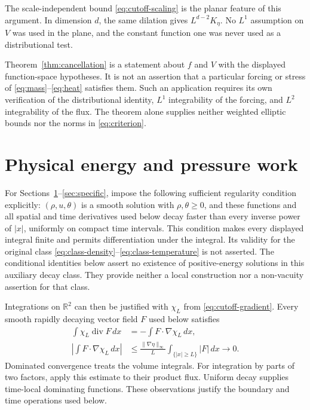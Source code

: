 \documentclass[10pt,twoside]{article}
\newcommand{\R}{\mathbb R}
\newcommand{\dd}{\,dx}
\newcommand{\Div}{\operatorname{div}}
\newcommand{\norm}[2]{\lVert#1\rVert_{#2}}
\begin{document}
The scale-independent bound \eqref{eq:cutoff-scaling} is the planar
feature of this argument. In dimension $d$, the same dilation gives
$L^{d-2}K_\eta$. No $L^1$ assumption on $V$ was used in the plane,
and the constant function one was never used as a distributional test.

Theorem~\ref{thm:cancellation} is a statement about $f$ and $V$ with
the displayed function-space hypotheses. It is not an assertion that
a particular forcing or stress of \eqref{eq:mass}--\eqref{eq:heat}
satisfies them. Such an application requires its own verification of
the distributional identity, $L^1$ integrability of the forcing, and
$L^2$ integrability of the flux. The theorem alone supplies neither
weighted elliptic bounds nor the norms in \eqref{eq:criterion}.

\section{Physical energy and pressure work}\label{sec:energy}
For Sections~\ref{sec:energy}--\ref{sec:specific}, impose the following
sufficient regularity condition explicitly: $(\rho,u,\theta)$ is a smooth
solution with $\rho,\theta\ge0$, and these functions and all spatial
and time derivatives used below decay faster than every inverse power
of $|x|$, uniformly on compact time intervals.
This condition makes every displayed integral finite and permits
differentiation under the integral. Its validity for the original class
\eqref{eq:class-density}--\eqref{eq:class-temperature} is not asserted.
The conditional identities below assert no existence of positive-energy
solutions in this auxiliary decay class. They provide neither a local
construction nor a non-vacuity assertion for that class.

Integrations on $\R^2$ can then be justified with $\chi_L$ from
\eqref{eq:cutoff-gradient}. Every smooth rapidly decaying vector field
$F$ used below satisfies
\begin{equation}\label{eq:vanishing-flux}
 \begin{split}
 \int\chi_L\Div F\dd&=-\int F\cdot\nabla\chi_L\dd,\\
 \left|\int F\cdot\nabla\chi_L\dd\right|
 &\le\frac{\norm{\nabla\eta}{\infty}}{L}
          \int_{\{|x|\ge L\}}|F|\dd\longrightarrow0.
 \end{split}
\end{equation}
Dominated convergence treats the volume integrals.
For integration by parts of two factors, apply this estimate to their
product flux. Uniform decay supplies time-local dominating functions.
These observations justify the boundary and time operations used below.
\end{document}

